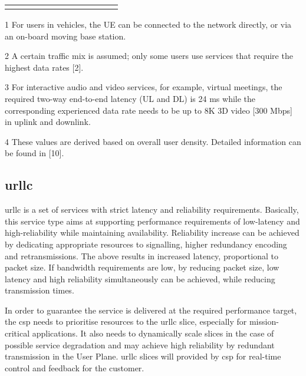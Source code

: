 \begin{sidewaystable*}
\begin{threeparttable}
\begin{tabularx}{\textwidth}{@{}l*{10}{C}c@{}}
    \addlinespace 
    \midrule
    \end{tabularx}
    \begin{tablenotes}
        \RaggedRight
        \item[1] For users in vehicles, the UE can be connected to the network directly, or via an on-board moving base station.
        \item[2] A certain traffic mix is assumed; only some users use services that require the highest data rates [2].
        \item[3] For interactive audio and video services, for example, virtual meetings, the required two-way end-to-end latency (UL and DL) is 24 ms while the corresponding experienced data rate needs to be up to 8K 3D video [300 Mbps] in uplink and downlink.
        \item[4] These values are derived based on overall user density. Detailed information can be found in [10].
    \end{tablenotes}

    \end{threeparttable}
    \end{sidewaystable*}

    \subsection{\acrfull{urllc}}
    
    \acrshort{urllc} is a set of services with strict latency and reliability requirements. Basically, this service type aims at supporting performance requirements of low-latency and high-reliability while maintaining availability. Reliability increase can be achieved by dedicating appropriate resources to signalling, higher redundancy encoding and retransmissions. The above results in increased latency, proportional to packet size. If bandwidth requirements are low, by reducing packet size, low latency and high reliability simultaneously can be achieved, while reducing transmission times. 
    
    In order to guarantee the service is delivered at the required performance target, the \acrshort{csp} needs to prioritise resources to the \acrshort{urllc} slice, especially for mission-critical applications. It also needs to dynamically scale slices in the case of possible service degradation and may achieve high reliability by redundant transmission in the User Plane. 
    \acrshort{urllc} slices will provided by \acrshort{csp} for real-time control and feedback for the customer.
    

